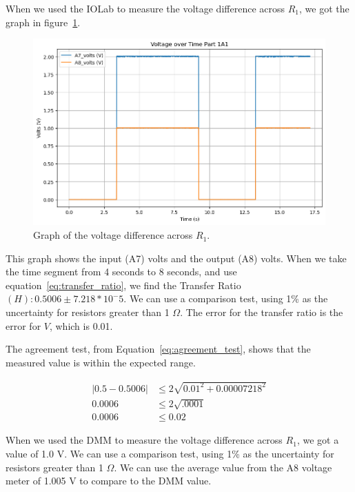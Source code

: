 \documentclass[11pt]{article}
\begin{document}
    When we used the IOLab to measure the voltage difference across $R_1$, we got the graph in figure~\ref{fig:voltage_graph_1a1}.
    \begin{figure}[h!]
        \begin{center}
            \includegraphics[width=1.0\linewidth]{resources/images/part1a1_voltage_over_time}
        \end{center}
        \caption{Graph of the voltage difference across $R_1$.}
        \label{fig:voltage_graph_1a1}
    \end{figure}

    This graph shows the input (A7) volts and the output (A8) volts.
    When we take the time segment from 4 seconds to 8 seconds, and use equation~\ref{eq:transfer_ratio}, we find the Transfer Ratio $(H): 0.5006 \pm 7.218 * 10^-5$.
    We can use a comparison test, using 1\% as the uncertainty for resistors greater than 1 $\Omega$.
    The error for the transfer ratio is the error for $V$, which is 0.01.
    
    The agreement test, from Equation~\ref{eq:agreement_test}, shows that the measured value is within the expected range.
    \begin{e}
        \begin{align*}
            |0.5 - 0.5006| &\le 2 \sqrt{0.01^2 + 0.00007218^2} \\
            0.0006 &\le 2 \sqrt{.0001} \\
            0.0006 &\le 0.02
        \end{align*}
    \end{e}

    When we used the DMM to measure the voltage difference across $R_1$, we got a value of 1.0 V. We can use a
    comparison test, using 1\% as the uncertainty for resistors greater than 1 $\Omega$.
    We can use the average value from the A8 voltage meter of 1.005 V to compare to the DMM value.
    
\end{document}
